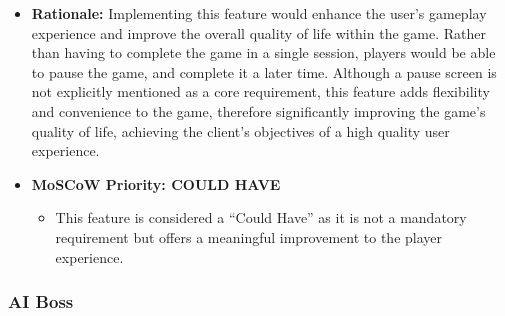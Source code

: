 \documentclass[11pt, a4paper]{article}
\begin{document}
\begin{itemize}
    \item \textbf{Rationale:} Implementing this feature would enhance the user’s gameplay experience and improve the overall quality of life within the game. Rather than having to complete the game in a single session, players would be able to pause the game, and complete it a later time. Although a pause screen is not explicitly mentioned as a core requirement, this feature adds flexibility and convenience to the game, therefore significantly improving the game’s quality of life, achieving the client’s objectives of a high quality user experience.

    \item \textbf{MoSCoW Priority: COULD HAVE}

          \begin{itemize}
              \item This feature is considered a “Could Have” as it is not a mandatory requirement but offers a meaningful improvement to the player experience.
          \end{itemize}
\end{itemize}

\newpage

\subsubsection{AI Boss}
\end{document}
